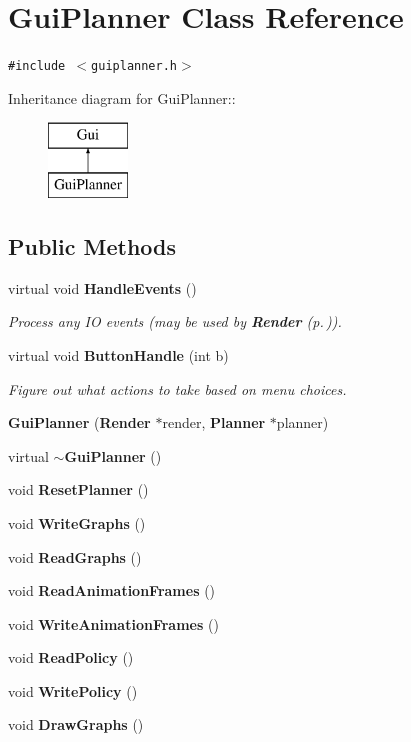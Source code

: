 \section{Gui\-Planner  Class Reference}
\label{classGuiPlanner}
{\tt \#include $<$guiplanner.h$>$}

Inheritance diagram for Gui\-Planner::\begin{figure}[H]
\begin{center}
\leavevmode
\includegraphics[height=2cm]{classGuiPlanner}
\end{center}
\end{figure}
\subsection*{Public Methods}
\begin{CompactItemize}
\item 
virtual void {\bf Handle\-Events} ()
\begin{CompactList}\small\item\em Process any IO events (may be used by {\bf Render} {\rm (p.\,\pageref{classRender})}).\item\end{CompactList}\item 
virtual void {\bf Button\-Handle} (int b)
\begin{CompactList}\small\item\em Figure out what actions to take based on menu choices.\item\end{CompactList}\item 
{\bf Gui\-Planner} ({\bf Render} $\ast$render, {\bf Planner} $\ast$planner)
\item 
virtual {\bf $\sim$Gui\-Planner} ()
\item 
void {\bf Reset\-Planner} ()
\item 
void {\bf Write\-Graphs} ()
\item 
void {\bf Read\-Graphs} ()
\item 
void {\bf Read\-Animation\-Frames} ()
\item 
void {\bf Write\-Animation\-Frames} ()
\item 
void {\bf Read\-Policy} ()
\item 
void {\bf Write\-Policy} ()
\item 
void {\bf Draw\-Graphs} ()
\end{CompactItemize}
